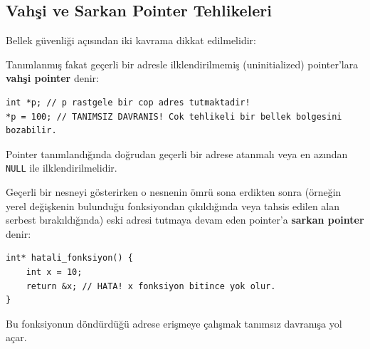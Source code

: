 \subsection{Vahşi ve Sarkan Pointer Tehlikeleri}

Bellek güvenliği açısından iki kavrama dikkat edilmelidir:

\begin{definition}
Tanımlanmış fakat geçerli bir adresle ilklendirilmemiş (uninitialized) pointer'lara \textbf{vahşi pointer} denir:
\begin{lstlisting}[language=CTemel]
int *p; // p rastgele bir cop adres tutmaktadir!
*p = 100; // TANIMSIZ DAVRANIS! Cok tehlikeli bir bellek bolgesini bozabilir.
\end{lstlisting}
Pointer tanımlandığında doğrudan geçerli bir adrese atanmalı veya en azından \texttt{NULL} ile ilklendirilmelidir.
\end{definition}

\begin{definition}
Geçerli bir nesneyi gösterirken o nesnenin ömrü sona erdikten sonra (örneğin yerel değişkenin bulunduğu fonksiyondan çıkıldığında veya tahsis edilen alan serbest bırakıldığında) eski adresi tutmaya devam eden pointer'a \textbf{sarkan pointer} denir:
\begin{lstlisting}[language=CTemel]
int* hatali_fonksiyon() {
    int x = 10;
    return &x; // HATA! x fonksiyon bitince yok olur.
}
\end{lstlisting}
Bu fonksiyonun döndürdüğü adrese erişmeye çalışmak tanımsız davranışa yol açar.
\end{definition}
